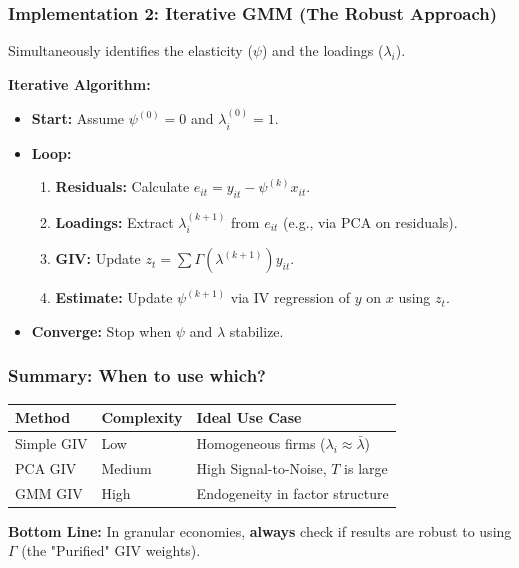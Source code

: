 \documentclass[aspectratio=169,11pt]{beamer}
\begin{document}
\begin{frame}
    \frametitle{Implementation 2: Iterative GMM (The Robust Approach)}
    
    {\large
        Simultaneously identifies the elasticity ($\psi$) and the loadings ($\lambda_i$).
    }
    
    \vspace{0.5cm}
    \textbf{Iterative Algorithm:}
    \begin{itemize}
        \item \textbf{Start:} Assume $\psi^{(0)} = 0$ and $\lambda_i^{(0)} = 1$.
        \item \textbf{Loop:}
        \begin{enumerate}
            \item \textbf{Residuals:} Calculate $e_{it} = y_{it} - \psi^{(k)} x_{it}$.
            \item \textbf{Loadings:} Extract $\lambda_i^{(k+1)}$ from $e_{it}$ (e.g., via PCA on residuals).
            \item \textbf{GIV:} Update $z_t = \sum \Gamma(\lambda^{(k+1)}) y_{it}$.
            \item \textbf{Estimate:} Update $\psi^{(k+1)}$ via IV regression of $y$ on $x$ using $z_t$.
        \end{enumerate}
        \item \textbf{Converge:} Stop when $\psi$ and $\lambda$ stabilize.
    \end{itemize}
\end{frame}

\begin{frame}
    \frametitle{Summary: When to use which?}
    
    \vspace{0.5cm}
    \begin{center}
    \renewcommand{\arraystretch}{1.5}
    \begin{tabular}{l l l}
        \toprule
        \textbf{Method} & \textbf{Complexity} & \textbf{Ideal Use Case} \\
        \midrule
        Simple GIV & Low & Homogeneous firms ($\lambda_i \approx \bar{\lambda}$) \\
        \rowcolor{Teal!10} PCA GIV & Medium & High Signal-to-Noise, $T$ is large \\
        \rowcolor{WarmOrange!10} GMM GIV & High & Endogeneity in factor structure \\
        \bottomrule
    \end{tabular}
    \end{center}
    
    \vspace{0.5cm}
    \textbf{Bottom Line:} In granular economies, \textbf{always} check if results are robust to using $\Gamma$ (the "Purified" GIV weights).
\end{frame}
\end{document}
